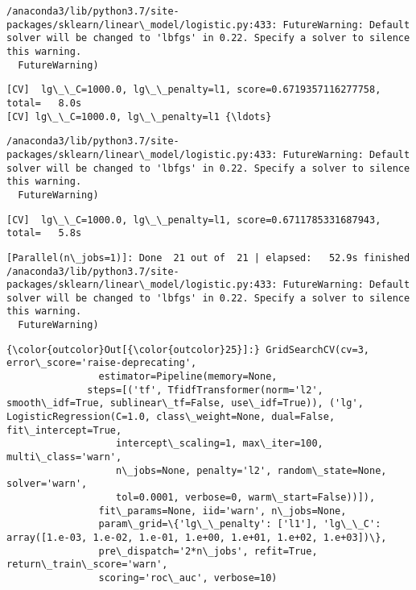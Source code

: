 \documentclass[11pt]{article}
\begin{document}
    \begin{Verbatim}[commandchars=\\\{\}]
/anaconda3/lib/python3.7/site-packages/sklearn/linear\_model/logistic.py:433: FutureWarning: Default solver will be changed to 'lbfgs' in 0.22. Specify a solver to silence this warning.
  FutureWarning)

    \end{Verbatim}

    \begin{Verbatim}[commandchars=\\\{\}]
[CV]  lg\_\_C=1000.0, lg\_\_penalty=l1, score=0.6719357116277758, total=   8.0s
[CV] lg\_\_C=1000.0, lg\_\_penalty=l1 {\ldots}

    \end{Verbatim}

    \begin{Verbatim}[commandchars=\\\{\}]
/anaconda3/lib/python3.7/site-packages/sklearn/linear\_model/logistic.py:433: FutureWarning: Default solver will be changed to 'lbfgs' in 0.22. Specify a solver to silence this warning.
  FutureWarning)

    \end{Verbatim}

    \begin{Verbatim}[commandchars=\\\{\}]
[CV]  lg\_\_C=1000.0, lg\_\_penalty=l1, score=0.6711785331687943, total=   5.8s

    \end{Verbatim}

    \begin{Verbatim}[commandchars=\\\{\}]
[Parallel(n\_jobs=1)]: Done  21 out of  21 | elapsed:   52.9s finished
/anaconda3/lib/python3.7/site-packages/sklearn/linear\_model/logistic.py:433: FutureWarning: Default solver will be changed to 'lbfgs' in 0.22. Specify a solver to silence this warning.
  FutureWarning)

    \end{Verbatim}

\begin{Verbatim}[commandchars=\\\{\}]
{\color{outcolor}Out[{\color{outcolor}25}]:} GridSearchCV(cv=3, error\_score='raise-deprecating',
                estimator=Pipeline(memory=None,
              steps=[('tf', TfidfTransformer(norm='l2', smooth\_idf=True, sublinear\_tf=False, use\_idf=True)), ('lg', LogisticRegression(C=1.0, class\_weight=None, dual=False, fit\_intercept=True,
                   intercept\_scaling=1, max\_iter=100, multi\_class='warn',
                   n\_jobs=None, penalty='l2', random\_state=None, solver='warn',
                   tol=0.0001, verbose=0, warm\_start=False))]),
                fit\_params=None, iid='warn', n\_jobs=None,
                param\_grid=\{'lg\_\_penalty': ['l1'], 'lg\_\_C': array([1.e-03, 1.e-02, 1.e-01, 1.e+00, 1.e+01, 1.e+02, 1.e+03])\},
                pre\_dispatch='2*n\_jobs', refit=True, return\_train\_score='warn',
                scoring='roc\_auc', verbose=10)
\end{Verbatim}
            
\end{document}
